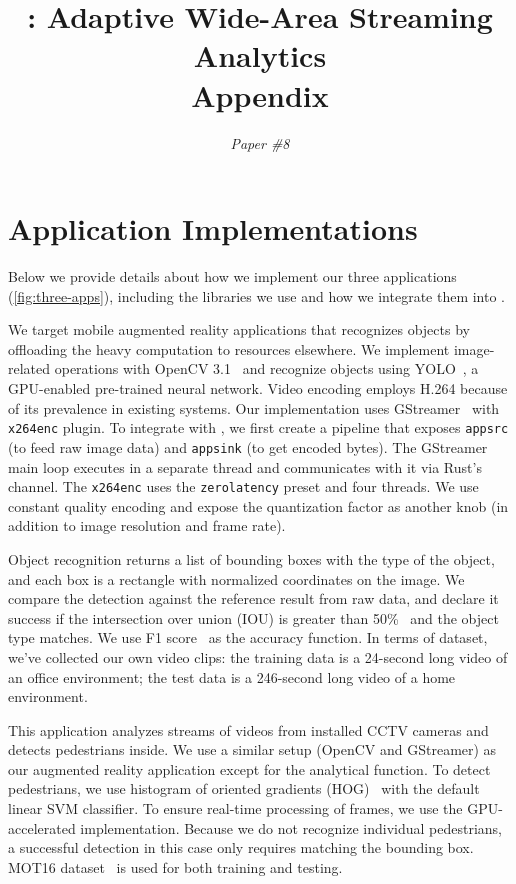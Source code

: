 \documentclass[twocolumn, 9pt]{article}
\begin{document}
\title{\sysname{}: Adaptive Wide-Area Streaming Analytics \\ Appendix}
\author{ \textit{Paper \#8} }
\date{}
\maketitle

\section{Application Implementations}
\label{appendix:appl-impl}

Below we provide details about how we implement our three applications
(\autoref{fig:three-apps}), including the libraries we use and how we integrate
them into \sysname{}.

 We target mobile augmented reality applications that
recognizes objects by offloading the heavy computation to resources elsewhere.
We implement image-related operations with OpenCV 3.1~\cite{opencvlibrary} and
recognize objects using YOLO~\cite{darknet13, redmon2016yolo9000}, a GPU-enabled
pre-trained neural network. Video encoding employs H.264 because of its
prevalence in existing systems. Our implementation uses
GStreamer~\cite{gstreamer} with \texttt{x264enc} plugin. To integrate with
\sysname{}, we first create a pipeline that exposes \texttt{appsrc} (to feed raw
image data) and \texttt{appsink} (to get encoded bytes). The GStreamer main loop
executes in a separate thread and \sysname{} communicates with it via Rust's
channel. The \texttt{x264enc} uses the \texttt{zerolatency} preset and four
threads. We use constant quality encoding and expose the quantization factor as
another knob (in addition to image resolution and frame rate).

Object recognition returns a list of bounding boxes with the type of the object,
and each box is a rectangle with normalized coordinates on the image. We compare
the detection against the reference result from raw data, and declare it success
if the intersection over union (IOU) is greater than
50\%~\cite{everingham2010pascal} and the object type matches. We use F1
score~\cite{Rijsbergen:1979:IR:539927} as the accuracy function. In terms of
dataset, we've collected our own video clips: the training data is a 24-second
long video of an office environment; the test data is a 246-second long video of
a home environment.

 This application analyzes streams of videos from
installed CCTV cameras and detects pedestrians inside. We use a similar setup
(OpenCV and GStreamer) as our augmented reality application except for the
analytical function. To detect pedestrians, we use histogram of oriented
gradients (HOG)~\cite{dalal2005histograms} with the default linear SVM
classifier. To ensure real-time processing of frames, we use the GPU-accelerated
implementation. Because we do not recognize individual pedestrians, a successful
detection in this case only requires matching the bounding box.  MOT16
dataset~\cite{milan2016mot16} is used for both training and testing.
\end{document}
